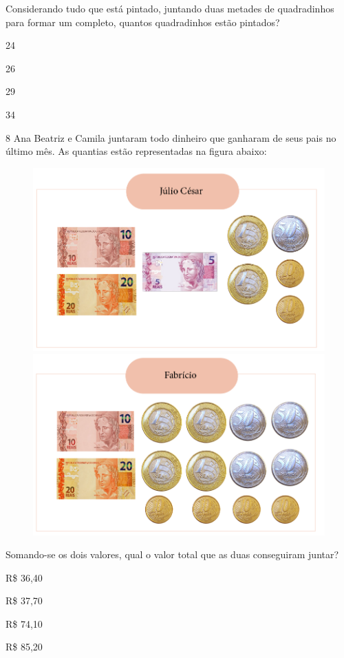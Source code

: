 Considerando tudo que está pintado, juntando duas metades de quadradinhos 
para formar um completo, quantos quadradinhos estão pintados?

\begin{minipage}{.5\textwidth}
\begin{escolha}
\item
  24
\item
  26
\item
  29
\item
  34
\end{escolha}
\end{minipage}

\pagebreak
\num{8} Ana Beatriz e Camila juntaram todo dinheiro que ganharam de seus
pais no último mês. As quantias estão representadas na figura abaixo:

\begin{figure}[htpb!]
\includegraphics[width=.5\textwidth]{../ilustracoes/MAT5/SAEB_5ANO_MAT_figura114a.png}
\includegraphics[width=.5\textwidth]{../ilustracoes/MAT5/SAEB_5ANO_MAT_figura114b.png}
\end{figure}

Somando-se os dois valores, qual o valor total que as duas conseguiram
juntar?

\begin{minipage}{.5\textwidth}
\begin{escolha}
\item
  R\$ 36,40
\item
  R\$ 37,70
\item
  R\$ 74,10
\item
  R\$ 85,20
\end{escolha}
\end{minipage}

